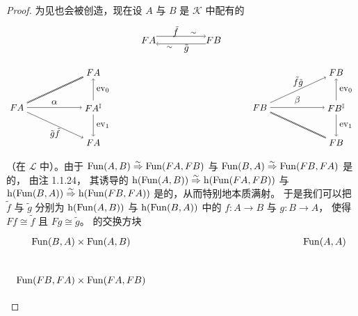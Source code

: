 \begin{proof}
为见\trEquivalence{}也会被创造，现在设 $A$ 与 $B$
是 $\mathcal{K}$ 中配有\trEquivalence{}的\trInfinityCategory
\begin{equation*}
\begin{tikzpicture}[x=1.6em,y=1.3em]
  \node (FA) at (0,0) {$FA$};
  \node (FB) at (4.2,0) {$FB$};
  \draw[->] (0.5,0.3) -- (3.7,0.3);
  \node at (1.75,0.66) {$\tilde{f}$};
  \node at (2.9,0.56) {$\scriptstyle\sim$};
  \draw[->] (3.7,-0.3) -- (0.5,-0.3);
  \node at (2.45,-0.68) {$\tilde{g}$};
  \node at (1.35,-0.58) {$\scriptstyle\sim$};
\end{tikzpicture}
\end{equation*}
\begin{equation*}
\begin{tikzpicture}[xscale=1.35,yscale=1.05]
\node (lA) at (0,0) {$FA$};
\node (tA) at (2.2,1.3) {$FA$};
\node (Ai) at (2.2,0) {$FA^{\mathbb{I}}$};
\node (bA) at (2.2,-1.3) {$FA$};
\draw[double] (lA) -- (tA);
\draw[->] (Ai) -- (tA) node[midway,right]{$\mathrm{ev}_0$};
\draw[->] (lA) -- (Ai) node[midway,above]{$\alpha$};
\draw[->] (lA) -- (bA) node[midway,below]{$\tilde{g}\tilde{f}$};
\draw[->] (Ai) -- (bA) node[midway,right]{$\mathrm{ev}_1$};
\node (lB) at (7,0) {$FB$};
\node (tB) at (9.2,1.3) {$FB$};
\node (Bi) at (9.2,0) {$FB^{\mathbb{I}}$};
\node (bB) at (9.2,-1.3) {$FB$};
\draw[->] (lB) -- (tB) node[midway,above]{$\tilde{f}\tilde{g}$};
\draw[->] (Bi) -- (tB) node[midway,right]{$\mathrm{ev}_0$};
\draw[->] (lB) -- (Bi) node[midway,above]{$\beta$};
\draw[double] (lB) -- (bB);
\draw[->] (Bi) -- (bB) node[midway,right]{$\mathrm{ev}_1$};
\end{tikzpicture}
\end{equation*}
（在 $\mathcal{L}$ 中）。由于
$\operatorname{Fun}(A,B)\mathrel{\stackrel{\sim}{\Rightarrow}}\operatorname{Fun}(FA,FB)$ 与
$\operatorname{Fun}(B,A)\mathrel{\stackrel{\sim}{\Rightarrow}}\operatorname{Fun}(FB,FA)$ 是\trQuasiCategory{}的\trEquivalence{}，
由注 1.1.24，%
其诱导的\trHomotopyCategory\trFunctor{}
$\mathrm{h}(\operatorname{Fun}(A,B))\mathrel{\stackrel{\sim}{\Rightarrow}}\mathrm{h}(\operatorname{Fun}(FA,FB))$
与 $\mathrm{h}(\operatorname{Fun}(B,A))\mathrel{\stackrel{\sim}{\Rightarrow}}\mathrm{h}(\operatorname{Fun}(FB,FA))$
是\trCategory{}的\trEquivalence{}，从而特别地本质满射。
于是我们可以把 $\tilde{f}$ 与 $\tilde{g}$ 分别\trLifting{}为
$\mathrm{h}(\operatorname{Fun}(A,B))$ 与 $\mathrm{h}(\operatorname{Fun}(B,A))$
中的\trFunctor{} $f\colon A\to B$ 与 $g\colon B\to A$，
使得 $Ff\cong\tilde{f}$ 且 $Fg\cong\tilde{g}$。
\trQuasiCategory{}的交换方块
\begin{equation*}
\begin{tikzpicture}[xscale=2.0,yscale=1.4]
\node (TL) at (0,1) {$\Fun(B,A)\times\Fun(A,B)$};
\node (TR) at (4.4,1) {$\Fun(A,A)$};
\node (BL) at (0,0) {$\Fun(FB,FA)\times\Fun(FA,FB)$};

\end{tikzpicture}
\end{equation*}
\end{proof}
